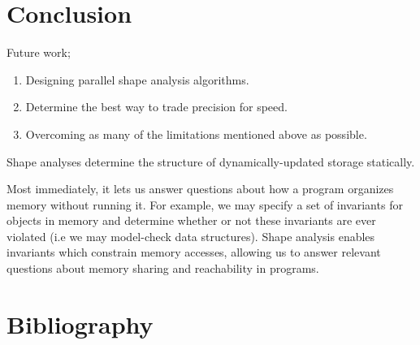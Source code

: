 \documentclass{article}
\begin{document}
\section{Conclusion}

Future work;
\begin{enumerate}[1.]
    \item Designing parallel shape analysis algorithms.
    \item Determine the best way to trade precision for speed.
    \item Overcoming as many of the limitations mentioned above as possible.
\end{enumerate}

Shape analyses determine the structure of dynamically-updated storage
statically.

Most immediately, it lets us answer questions about how a program organizes
memory without running it. For example, we may specify a set of invariants
for objects in memory and determine whether or not these invariants are ever
violated (i.e we may model-check data structures). Shape analysis enables
invariants which constrain memory accesses, allowing us to answer relevant
questions about memory sharing and reachability in programs.

\section{Bibliography}
\end{document}
